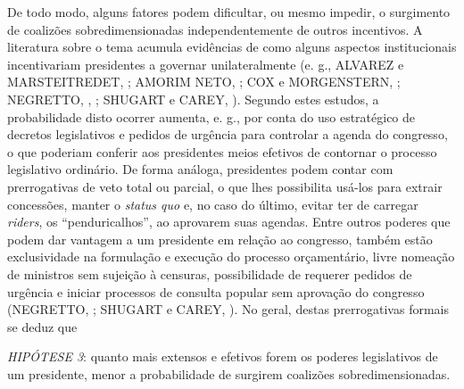 De todo modo, alguns fatores podem dificultar, ou mesmo impedir, o surgimento de coalizões sobredimensionadas independentemente de outros incentivos. A literatura sobre o tema acumula evidências de como alguns aspectos institucionais incentivariam presidentes a governar unilateralmente (e. g., ALVAREZ e MARSTEITREDET, \citeyear{alvarez2010}; AMORIM NETO, \citeyear{neto2006}; COX e MORGENSTERN, \citeyear{cox2001}; NEGRETTO, \citeyear{negretto2004}, \citeyear{negretto2006}; SHUGART e CAREY, \citeyear{shugart1992}). Segundo estes estudos, a probabilidade disto ocorrer aumenta, e. g., por conta do uso estratégico de decretos legislativos e pedidos de urgência para controlar a agenda do congresso, o que poderiam conferir aos presidentes meios efetivos de contornar o processo legislativo ordinário. De forma análoga, presidentes podem contar com prerrogativas de veto total ou parcial, o que lhes possibilita usá-los para extrair concessões, manter o \textit{status quo} e, no caso do último, evitar ter de carregar \textit{riders}, os “penduricalhos”, ao aprovarem suas agendas. Entre outros poderes que podem dar vantagem a um presidente em relação ao congresso, também estão exclusividade na formulação e execução do processo orçamentário, livre nomeação de ministros sem sujeição à censuras, possibilidade de requerer pedidos de urgência e iniciar processos de consulta popular sem aprovação do congresso (NEGRETTO, \citeyear{negretto2013}; SHUGART e CAREY, \citeyear{shugart1992}). No geral, destas prerrogativas formais se deduz que

\vspace*{1\baselineskip}\vspace*{-\parskip}
\noindent
\textit{HIPÓTESE 3}: quanto mais extensos e efetivos forem os poderes legislativos de um presidente, menor a probabilidade de surgirem coalizões sobredimensionadas.
\vspace*{1\baselineskip}

